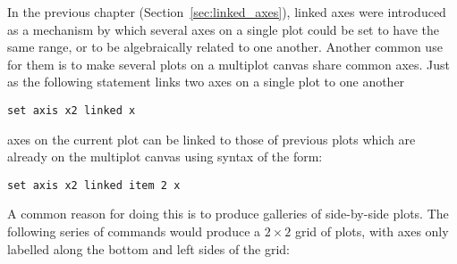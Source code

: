 In the previous chapter (Section~\ref{sec:linked_axes}), linked axes were
introduced as a mechanism by which several axes on a single plot could be set
to have the same range, or to be algebraically related to one another. Another
common use for them is to make several plots on a multiplot canvas share common
axes. Just as the following statement links two axes on a single plot to one
another
\begin{verbatim}
set axis x2 linked x
\end{verbatim}
axes on the current plot can be linked to those of previous plots which are
already on the multiplot canvas using syntax of the form:
\begin{verbatim}
set axis x2 linked item 2 x
\end{verbatim}

A common reason for doing this is to produce galleries of side-by-side plots.
The following series of commands would produce a $2\times2$ grid of plots, with
axes only labelled along the bottom and left sides of the grid:


